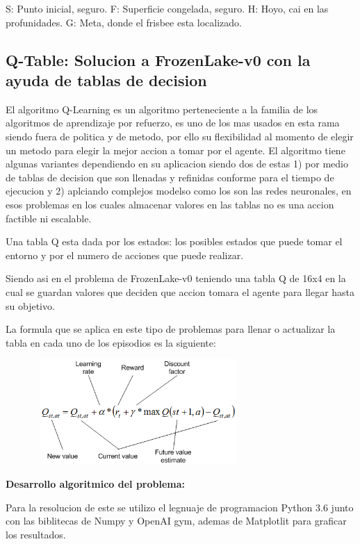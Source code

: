 S: Punto inicial, seguro.
F: Superficie congelada, seguro.
H: Hoyo, cai en las profunidades.
G: Meta, donde el frisbee esta localizado.

\subsection{Q-Table: Solucion a FrozenLake-v0 con la ayuda de tablas de decision}

El algoritmo Q-Learning es un algoritmo perteneciente a la familia de los algoritmos de aprendizaje por refuerzo, es uno de los mas usados en esta rama siendo fuera de politica y de metodo, por ello su flexibilidad al momento de elegir un metodo para elegir la mejor accion a tomar por el agente. El algoritmo tiene algunas variantes dependiendo en su aplicacion siendo dos de estas 1) por medio de tablas de decision que son llenadas y refinidas  conforme para el tiempo de ejecucion y 2) aplciando complejos modelso como los son las redes neuronales, en esos problemas en los cuales almacenar valores en las tablas no es una accion factible ni escalable.

Una tabla Q esta dada por los estados: los posibles estados que puede tomar el entorno y por el numero de acciones que puede realizar.

Siendo asi en el problema de FrozenLake-v0 teniendo una tabla Q de 16x4 en la cual se guardan valores que deciden que accion tomara el agente para llegar hasta su objetivo.

La formula que se aplica en este tipo de problemas para llenar o actualizar la tabla en cada uno de los episodios es la siguiente:

\begin{figure}[ht]
	\centering
	\includegraphics*[width=8cm,height=4cm,keepaspectratio]{figuras/formula} 
	\label{fig:formula Q-Tables}
\end{figure}

\textbf{Desarrollo algoritmico del problema: }

Para la resolucion de este se utilizo el legnuaje de programacion Python 3.6 junto con las biblitecas de Numpy y OpenAI gym, ademas de Matplotlit para graficar los resultados.


